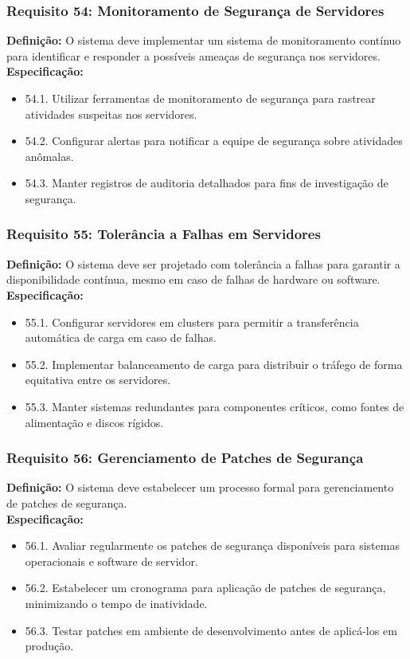 \subsubsection{Requisito 54: Monitoramento de Segurança de Servidores}
\textbf{Definição:} O sistema deve implementar um sistema de monitoramento contínuo para identificar e responder a possíveis ameaças de segurança nos servidores.
\\
\textbf{Especificação:}
\begin{itemize}
	\item 54.1. Utilizar ferramentas de monitoramento de segurança para rastrear atividades suspeitas nos servidores.
	\item 54.2. Configurar alertas para notificar a equipe de segurança sobre atividades anômalas.
	\item 54.3. Manter registros de auditoria detalhados para fins de investigação de segurança.
\end{itemize}

\subsubsection{Requisito 55: Tolerância a Falhas em Servidores}
\textbf{Definição:} O sistema deve ser projetado com tolerância a falhas para garantir a disponibilidade contínua, mesmo em caso de falhas de hardware ou software.
\\
\textbf{Especificação:}
\begin{itemize}
	\item 55.1. Configurar servidores em clusters para permitir a transferência automática de carga em caso de falhas.
	\item 55.2. Implementar balanceamento de carga para distribuir o tráfego de forma equitativa entre os servidores.
	\item 55.3. Manter sistemas redundantes para componentes críticos, como fontes de alimentação e discos rígidos.
\end{itemize}

\subsubsection{Requisito 56: Gerenciamento de Patches de Segurança}
\textbf{Definição:} O sistema deve estabelecer um processo formal para gerenciamento de patches de segurança.
\\
\textbf{Especificação:}
\begin{itemize}
	\item 56.1. Avaliar regularmente os patches de segurança disponíveis para sistemas operacionais e software de servidor.
	\item 56.2. Estabelecer um cronograma para aplicação de patches de segurança, minimizando o tempo de inatividade.
	\item 56.3. Testar patches em ambiente de desenvolvimento antes de aplicá-los em produção.
\end{itemize}

